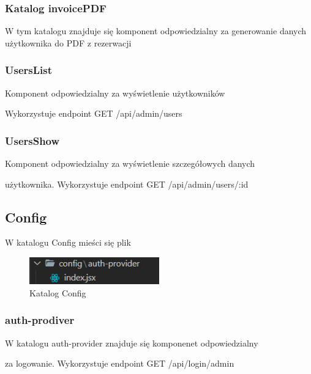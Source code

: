 \documentclass[titlepage]{article}
\begin{document}
\subsubsection{Katalog invoicePDF}
W tym katalogu znajduje się komponent odpowiedzialny za generowanie danych użytkownika do PDF z rezerwacji 

\subsubsection{UsersList}
Komponent odpowiedzialny za wyświetlenie użytkowników

\newline
Wykorzystuje endpoint GET /api/admin/users

\subsubsection{UsersShow}
Komponent odpowiedzialny za wyświetlenie szczegółowych danych

\newline
użytkownika.
Wykorzystuje endpoint GET /api/admin/users/:id


\subsection{Config}
W katalogu Config mieści się plik

\begin{figure}[h]
\centering
\includegraphics[width=0.5\textwidth]{config-admin.png}

\caption{Katalog Config}
\label{fig:obrazek Config}
\end{figure}

\subsubsection{auth-prodiver}
W katalogu auth-provider znajduje się komponenet odpowiedzialny

\newline
za logowanie.
Wykorzystuje endpoint GET /api/login/admin
\end{document}
